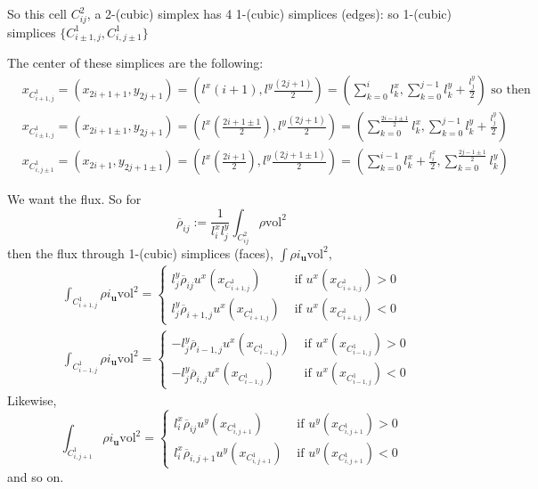 \documentclass[10pt]{amsart}
\begin{document}
\begin{multicols*}{2}
So this cell $C^2_{ij}$, a 2-(cubic) simplex has 4 1-(cubic) simplices (edges): so 1-(cubic) simplices $\lbrace C_{i\pm 1, j }^1, C^1_{i,j\pm1}\rbrace$

The center of these simplices are the following:
\[
\begin{aligned}
  & x_{C^1_{i+1,j}} = (x_{2i+1+1},y_{2j+1}) = (l^x(i+1), l^y\frac{(2j+1)}{2} ) = \left( \sum_{k=0}^i l_k^x, \sum_{k=0}^{j-1} l_k^y + \frac{l_j^y}{2} \right) \text{ so then } \\ 
  & x_{C^1_{i\pm 1,j}} = (x_{2i+1\pm 1},y_{2j+1}) = (l^x\left( \frac{2i+1\pm 1}{2}\right) , l^y\frac{(2j+1)}{2} ) = \left( \sum_{k=0}^{ \frac{2i - 1 \pm 1 }{2} } l_k^x, \sum_{k=0}^{j-1} l_k^y + \frac{l_j^y}{2} \right) \\ 
  &  x_{C^1_{i,j\pm 1}} = (x_{2i+1},y_{2j+1 \pm 1}) = (l^x\left( \frac{2i+1}{2}\right) , l^y\frac{(2j+1 \pm 1)}{2} ) = \left(  \sum_{k=0}^{i-1} l_k^x + \frac{l_i^x}{2} , \sum_{k=0}^{ \frac{2j - 1 \pm 1 }{2} } l_k^y  \right)
\end{aligned}
\]

We want the flux.  So for
\[
\overline{\rho}_{ij} := \frac{1}{l_i^x l_j^y} \int_{C^2_{ij}} \rho \text{vol}^2
\]
then the flux through 1-(cubic) simplices (faces), $\int \rho i_{\mathbf{u}}\text{vol}^2$,
\[
\begin{aligned}
 &  \int_{C^1_{i+1,j}} \rho i_{\mathbf{u}} \text{vol}^2 = \begin{cases} l_j^y \overline{\rho}_{ij} u^x(x_{C^1_{i+1, j} } ) & \text{ if } u^x(x_{C^1_{i+1,j} }) > 0 \\ 
 l_j^y \overline{\rho}_{i+1,j} u^x(x_{C^1_{i+1, j} } ) & \text{ if } u^x(x_{C^1_{i+1,j} }) < 0 \end{cases} \\
&      \int_{C^1_{i-1,j}} \rho i_{\mathbf{u}} \text{vol}^2 = \begin{cases} -l_j^y \overline{\rho}_{i-1,j} u^x(x_{C^1_{i-1, j} } ) & \text{ if } u^x(x_{C^1_{i-1,j} }) > 0 \\ 
 -l_j^y \overline{\rho}_{i,j} u^x(x_{C^1_{i-1, j} } ) & \text{ if } u^x(x_{C^1_{i-1,j} }) < 0 \end{cases}
\end{aligned}
\]
Likewise,
\[
\int_{C^1_{i,j+1}} \rho i_{\mathbf{u}} \text{vol}^2 = \begin{cases} l_i^x \overline{\rho}_{ij} u^y(x_{C^1_{i, j+1} } ) & \text{ if } u^y(x_{C^1_{i,j+1} }) > 0 \\ 
 l_i^x \overline{\rho}_{i,j+1} u^y(x_{C^1_{i, j+1} } ) & \text{ if } u^y(x_{C^1_{i,j+1} }) < 0 \end{cases}
\]
and so on.




\end{multicols*}
\end{document}
